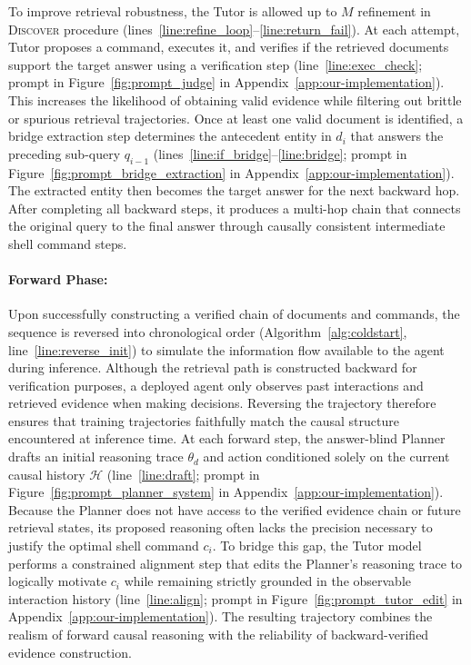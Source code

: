 \documentclass{llmxive}
\begin{document}
To improve retrieval robustness, the Tutor is allowed up to $M$ refinement in \textsc{Discover} procedure (lines~\ref{line:refine_loop}--\ref{line:return_fail}). At each attempt, Tutor proposes a command, executes it, and verifies if the retrieved documents support the target answer using a verification step (line~\ref{line:exec_check}; prompt in Figure~\ref{fig:prompt_judge} in Appendix~\ref{app:our-implementation}). This increases the likelihood of obtaining valid evidence while filtering out brittle or spurious retrieval trajectories. Once at least one valid document is identified, a bridge extraction step determines the antecedent entity in $d_i$ that answers the preceding sub-query $q_{i-1}$ (lines~\ref{line:if_bridge}--\ref{line:bridge}; prompt in Figure~\ref{fig:prompt_bridge_extraction} in Appendix~\ref{app:our-implementation}). The extracted entity then becomes the target answer for the next backward hop. After completing all backward steps, it produces a multi-hop chain that connects the original query to the final answer through causally consistent intermediate shell command steps.

\paragraph{Forward Phase:}

Upon successfully constructing a verified chain of documents and commands, the sequence is reversed into chronological order (Algorithm~\ref{alg:coldstart}, line~\ref{line:reverse_init}) to simulate the information flow available to the agent during inference. Although the retrieval path is constructed backward for verification purposes, a deployed agent only observes past interactions and retrieved evidence when making decisions. Reversing the trajectory therefore ensures that training trajectories faithfully match the causal structure encountered at inference time. At each forward step, the answer-blind Planner drafts an initial reasoning trace $\theta_d$ and action conditioned solely on the current causal history $\mathcal{H}$ (line~\ref{line:draft}; prompt in Figure~\ref{fig:prompt_planner_system} in Appendix~\ref{app:our-implementation}). Because the Planner does not have access to the verified evidence chain or future retrieval states, its proposed reasoning often lacks the precision necessary to justify the optimal shell command $c_i$. To bridge this gap, the Tutor model performs a constrained alignment step that edits the Planner's reasoning trace to logically motivate $c_i$ while remaining strictly grounded in the observable interaction history (line~\ref{line:align}; prompt in Figure~\ref{fig:prompt_tutor_edit} in Appendix~\ref{app:our-implementation}). The resulting trajectory combines the realism of forward causal reasoning with the reliability of backward-verified evidence construction.
\end{document}
